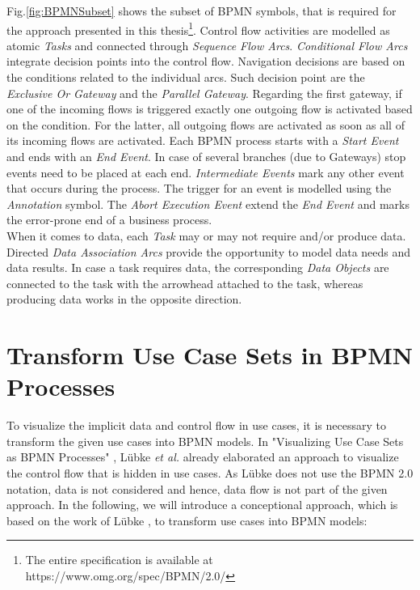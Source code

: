 \noindent
Fig.\ref{fig:BPMNSubset} shows the subset of BPMN symbols, that is required for the approach presented in this thesis\footnote{The entire specification is available at https://www.omg.org/spec/BPMN/2.0/}. Control flow activities are modelled as atomic \textit{Tasks} and connected through \textit{Sequence Flow Arcs}. \textit{Conditional Flow Arcs} integrate decision points into the control flow. Navigation decisions are based on the conditions related to the individual arcs. Such decision point are the \textit{Exclusive Or Gateway} and the \textit{Parallel Gateway}. Regarding the first gateway, if one of the incoming flows is triggered exactly one outgoing flow is activated based on the condition. For the latter, all outgoing flows are activated as soon as all of its incoming flows are activated. Each BPMN process starts with a \textit{Start Event} and ends with an \textit{End Event}. In case of several branches (due to Gateways) stop events need to be placed at each end. \textit{Intermediate Events} mark any other event that occurs during the process. The trigger for an event is modelled using the \textit{Annotation} symbol. The \textit{Abort Execution Event} extend the \textit{End Event} and marks the error-prone end of a business process. \\
When it comes to data, each \textit{Task} may or may not require and/or produce data. Directed \textit{Data Association Arcs} provide the opportunity to model data needs and data results. In case a task requires data, the corresponding \textit{Data Objects} are connected to the task with the arrowhead attached to the task, whereas producing data works in the opposite direction. \\


\section{Transform Use Case Sets in BPMN Processes}
\label{sec:PrepApproach:TransformUCtoBPMN}
To visualize the implicit data and control flow in use cases, it is necessary to transform the given use cases into BPMN models. In "Visualizing Use Case Sets as BPMN Processes" \cite{VisualizeBPMN}, Lübke \textit{et al.} already elaborated an approach to visualize the control flow that is hidden in use cases. As Lübke does not use the BPMN 2.0 notation, data is not considered and hence, data flow is not part of the given approach. In the following, we will introduce a conceptional approach, which is based on the work of Lübke \cite{VisualizeBPMN}, to transform use cases into BPMN models:



